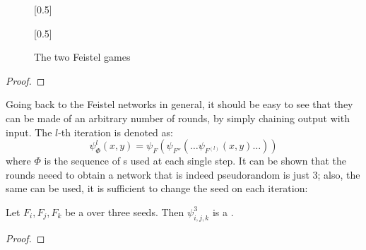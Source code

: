 \begin{figure}[ht]
    \centering
    \begin{cryptogame}{}{}{}[0.5]
    \end{cryptogame}
    \begin{cryptogame}{}{}{}[0.5]
    \end{cryptogame}

    \caption{The two Feistel games}
    \label{fig:feisteltwins}
\end{figure}

\begin{proof}
\end{proof}


Going back to the Feistel networks in general, it should be easy to see that they can be made of an arbitrary number of rounds, by simply chaining output with input. The $l$-th iteration is denoted as: 
\[
    \psi^l_\Phi(x, y) = \psi_{F}(\psi_{F''}( \ldots \psi_{F^{(l)}}(x, y) \ldots ))
\]
where $\Phi$ is the sequence of \prf{}s used at each single step. It can be shown that the rounds neeed to obtain a network that is indeed pseudorandom is just 3; also, the same \prf{} can be used, it is sufficient to change the seed on each iteration\footnotemark:

\begin{theorem}
    Let $F_i, F_j, F_k$ be a \prf{} over three seeds. Then $\psi^3_{i, j, k}$ is a \prp.
\end{theorem}


\begin{proof}
\end{proof}